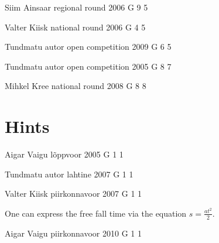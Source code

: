 \documentclass[11pt]{article}
\begin{document}
\ylDisplay{} %
{Siim Ainsaar} %
{regional round} %
{2006} %
{G 9} %
{5} %
{

\ifEngStatement
\fi
}

\ylDisplay{} %
{Valter Kiisk} %
{national round} %
{2006} %
{G 4} %
{5} %
{

\ifEngStatement
\fi
}

\ylDisplay{} %
{Tundmatu autor} %
{open competition} %
{2009} %
{G 6} %
{5} %
{

\ifEngStatement
\fi
}

\ylDisplay{} %
{Tundmatu autor} %
{open competition} %
{2005} %
{G 8} %
{7} %
{

\ifEngStatement
\fi
}

\ylDisplay{} %
{Mihkel Kree} %
{national round} %
{2008} %
{G 8} %
{8} %
{

\ifEngStatement
\fi
}
\newpage\normalsize\section{Hints}
        \ToggleEngHint
        
{Aigar Vaigu} %
{lõppvoor} %
{2005} %
{G 1} %
{1} %
{

\ifEngHint
\fi
}

{Tundmatu autor} %
{lahtine} %
{2007} %
{G 1} %
{1} %
{

\ifEngHint
\fi
}

{Valter Kiisk} %
{piirkonnavoor} %
{2007} %
{G 1} %
{1} %
{

\ifEngHint
One can express the free fall time via the equation $s = \frac{at^2}{2}$.
\fi
}

{Aigar Vaigu} %
{piirkonnavoor} %
{2010} %
{G 1} %
{1} %
{

\ifEngHint
\fi
}
\end{document}
